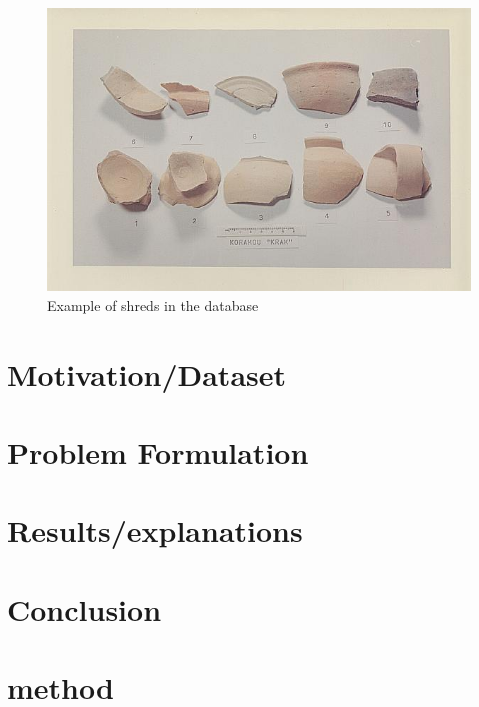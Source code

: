 \documentclass[10pt,a4paper]{article}
\begin{document}
\begin{figure}
\includegraphics[width=\textwidth]{korakou}
\caption{Example of shreds in the database}
\label{fig:sample}
\end{figure}






\section{Motivation/Dataset}



\section{Problem Formulation}






\section{Results/explanations}

\section{Conclusion}












\section{method}

\printbibliography
\end{document}
